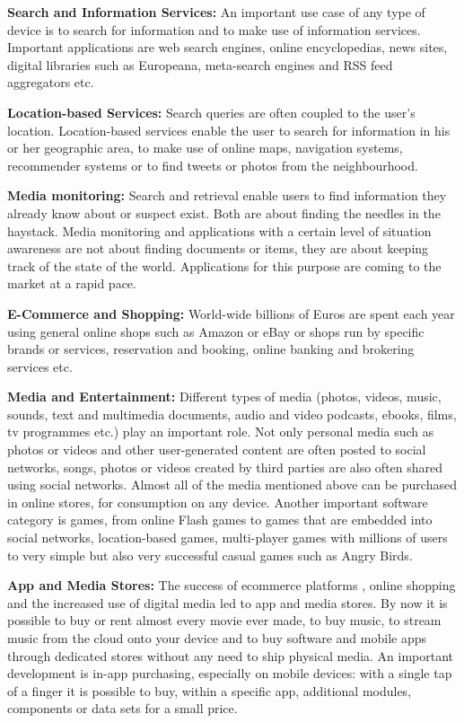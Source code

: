\documentclass[10pt, plain]{../../metanetpaper}
\begin{document}
\begin{multicols}{2}
\textbf{Search and Information Services:} An important use case of any type of device is to search for information and to make use of information services. Important applications are web search engines, online encyclopedias, news sites, digital libraries such as Europeana, meta-search engines and RSS feed aggregators etc.

\columnbreak

\textbf{Location-based Services:} Search queries are often coupled to the user's location. Location-based services enable the user to search for information in his or her geographic area, to make use of online maps, navigation systems, recommender systems or to find tweets or photos from the neighbourhood.

\textbf{Media monitoring:} Search and retrieval enable users to find information they already know about or suspect exist. Both are about finding the needles in the haystack. Media monitoring and applications with a certain level of situation awareness are not about finding documents or items, they are about keeping track of the state of the world. Applications for this purpose are coming to the market at a rapid pace.

\textbf{E-Commerce and Shopping:} World-wide billions of Euros are spent each year using general online shops such as Amazon or eBay or shops run by specific brands or services, reservation and booking, online banking and brokering services etc. 

\textbf{Media and Entertainment:} Different types of media (photos, videos, music, sounds, text and multimedia documents, audio and video podcasts, ebooks, films, tv programmes etc.) play an important role. Not only personal media such as photos or videos and other user-generated content are often posted to social networks, songs, photos or videos created by third parties are also often shared using social networks. Almost all of the media mentioned above can be purchased in online stores, for consumption on any device. Another important software category is games, from online Flash games to games that are embedded into social networks, location-based games, multi-player games with millions of users to very simple but also very successful casual games such as Angry Birds.

\textbf{App and Media Stores:} The success of ecommerce platforms \cite{bruegel12}, online shopping and the increased use of digital media led to app and media stores. By now it is possible to buy or rent almost every movie ever made, to buy music, to stream music from the cloud onto your device and to buy software and mobile apps through dedicated stores without any need to ship physical media. An important development is in-app purchasing, especially on mobile devices: with a single tap of a finger it is possible to buy, within a specific app, additional modules, components or data sets for a small price.


\end{multicols}
\end{document}
